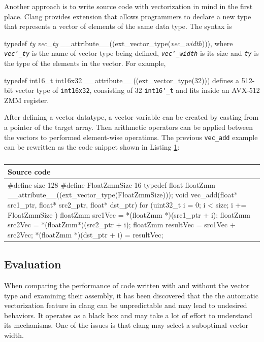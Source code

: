 \documentclass[logo,bsc,singlespacing,parskip]{infthesis}
\newenvironment{VerbatimCompact}
  {\vspace*{-2.5mm}\VerbatimEnvironment
   \par\Verbatim}
  {\endVerbatim\vspace*{-2.4mm}}
\begin{document}
Another approach is to write source code with vectorization in mind in the first
place. Clang provides extension that allows programmers to declare a new type
that represents a vector of elements of the same data type. The syntax is 
\begin{VerbatimCompact}[commandchars=\\\{\}]
typedef \textit{ty} \textit{vec_ty} __attribute__((ext_vector_type(\textit{vec_width}))), 
\end{VerbatimCompact}
where \textit{\texttt{vec\char`_ty}} is the name of vector type being defined,
\textit{\texttt{vec\char`_width}} is its size and \textit{\texttt{ty}} is the
type of the elements in the vector. For example, 
\begin{VerbatimCompact}[commandchars=\\\{\}]
typedef int16_t int16x32 __attribute__((ext_vector_type(32)))
\end{VerbatimCompact}
defines a 512-bit vector type of \texttt{int16x32}, consisting of 32
\texttt{int16\char`_t} and fits inside an AVX-512 ZMM register. 

After defining a vector datatype, a vector variable can be created by casting
from a pointer of the target array. Then arithmetic operators can be applied
between the vectors to performed element-wise operations. The previous
\texttt{vec\_add} example can be rewritten as the code snippet shown in Listing
\ref{vec-add-float-vecty}:

\begin{table}[ht]\captionsetup{name=Listing}
\begin{tabular}{>{\raggedright\arraybackslash}p{14cm}}
    Source code\\
    \midrule
    \begin{VerbatimCompact}
#define size 128
#define FloatZmmSize 16
typedef float floatZmm __attribute__((ext_vector_type(FloatZmmSize)));
void vec_add(float* src1_ptr, float* src2_ptr, float* dst_ptr) {
    for (uint32_t i = 0; i < size; i += FloatZmmSize ){
        floatZmm src1Vec = *(floatZmm *)(src1_ptr + i);
        floatZmm src2Vec = *(floatZmm*)(src2_ptr + i);
        floatZmm resultVec = src1Vec + src2Vec;
        *(floatZmm *)(dst_ptr + i) = resultVec;
    }
}
\end{VerbatimCompact}
\end{tabular}
\caption{}
\label{vec-add-float-vecty}
\end{table}
\subsection{Evaluation}
When comparing the performance of code written with and without the vector type
and examining their assembly, it has been discovered that the the automatic
vectorization feature in clang can be unpredictable and may lead to undesired
behaviors. It operates as a black box and may take a lot of effort to understand
its mechanisms. One of the issues is that clang may select a suboptimal vector
width.
\end{document}
